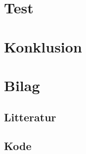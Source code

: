 \documentclass{article}
\begin{document}
\section{Test}

\section{Konklusion}

\section{Bilag}
\subsection{Litteratur}
\subsection{Kode}
\end{document}
